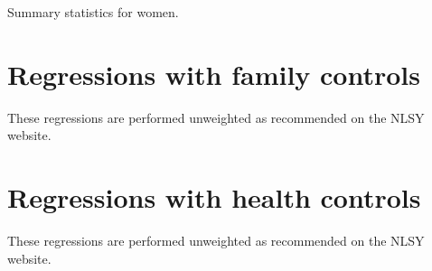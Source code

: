\documentclass{article}
\begin{document}
\begin{table}[h]
\label{tab:summary_women}
\caption{Summary statistics for women.}

\end{table}

\clearpage

\section{Regressions with family controls}
These regressions are performed unweighted as recommended on the NLSY website.

\begin{landscape}

\end{landscape}

\begin{landscape}

\end{landscape}

\clearpage

\section{Regressions with health controls}
These regressions are performed unweighted as recommended on the NLSY website.




\end{document}
